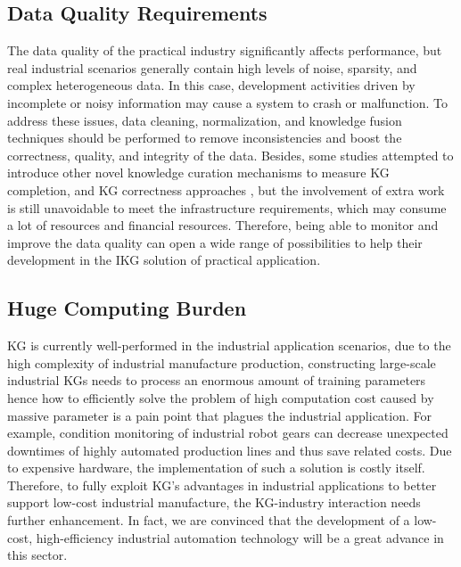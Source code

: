 \documentclass[11pt]{article}
\begin{document}
\subsection{Data Quality Requirements}
\par{The data quality of the practical industry significantly affects performance, but real industrial scenarios generally contain high levels of noise, sparsity, and complex heterogeneous data.
In this case, development activities driven by incomplete or noisy information may cause a system to crash or malfunction.
To address these issues, data cleaning, normalization, and knowledge fusion techniques should be performed to remove inconsistencies and boost the correctness, quality, and integrity of the data.
Besides, some studies attempted to introduce other novel knowledge curation mechanisms to measure KG completion, and KG correctness approaches \cite{bib61}, but the involvement of extra work is still unavoidable to meet the infrastructure requirements, which may consume a lot of resources and financial resources.
Therefore, being able to monitor and improve the data quality can open a wide range of possibilities to help their development in the IKG solution of practical application.}

\subsection{Huge Computing Burden}
\par{KG is currently well-performed in the industrial application scenarios, due to the high complexity of industrial manufacture production, constructing large-scale industrial KGs needs to process an enormous amount of training parameters hence how to efficiently solve the problem of high computation cost caused by massive parameter is a pain point that plagues the industrial application.
For example, condition monitoring of industrial robot gears can decrease unexpected downtimes of highly automated production lines and thus save related costs.
Due to expensive hardware, the implementation of such a solution is costly itself.
Therefore, to fully exploit KG’s advantages in industrial applications to better support low-cost industrial manufacture, the KG-industry interaction needs further enhancement.
In fact, we are convinced that the development of a low-cost, high-efficiency industrial automation technology will be a great advance in this sector.}
\end{document}
